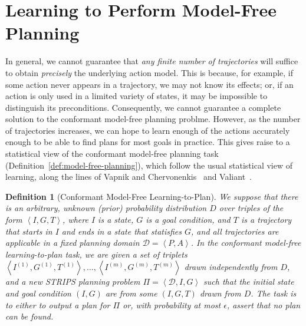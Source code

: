 \documentclass[letterpaper]{article}
\newtheorem{definition}{Definition}
\newcommand{\tuple}[1]{\ensuremath{\left \langle #1 \right \rangle }}
\begin{document}



\section{Learning to Perform Model-Free Planning}
In general, we cannot guarantee that {\em any finite number of trajectories} will suffice to obtain {\em precisely} the underlying action model. This is because, for example, if some action never appears in a trajectory, we may not know its effects; or, if an action is only used in a limited variety of states, it may be impossible to distinguish its preconditions. Consequently, we cannot guarantee a complete solution to the conformant model-free planning problme. However, as the number of trajectories increases, we can hope to learn enough of the actions accurately enough to be able to find plans for most goals in practice. This gives raise to a statistical view of the conformant model-free planning task (Definition~\ref{def:model-free-planning}), which follow the usual statistical view of learning, along the lines of Vapnik and Chervonenkis~ and Valiant~.  %

\begin{definition}[Conformant Model-Free Learning-to-Plan] We suppose that there is an arbitrary, unknown (prior) probability distribution $D$ over triples of the form $\tuple{I,G,T}$, where $I$ is a state, $G$ is a goal condition, and $T$ is a trajectory that starts in $I$ and ends in a state that statisfies $G$, 
and all trajectories are applicable in a fixed planning domain $\mathcal{D}=\tuple{P,A}$. 
In the conformant model-free learning-to-plan task, we are given a set of triplets $\tuple{I^{(1)},G^{(1)},T^{(1)}},\ldots,\tuple{I^{(m)},G^{(m)},T^{(m)}}$ drawn independently from $D$, 
and a new STRIPS planning problem $\Pi=\tuple{\mathcal{D}, I, G}$  
such that the initial state and goal condition $(I,G)$ are from some $(I,G,T)$ drawn from $D$. 
The task is to either to output a plan for $\Pi$ or, with probability at most $\epsilon$, assert that no plan can be found.
\end{definition}
\end{document}
